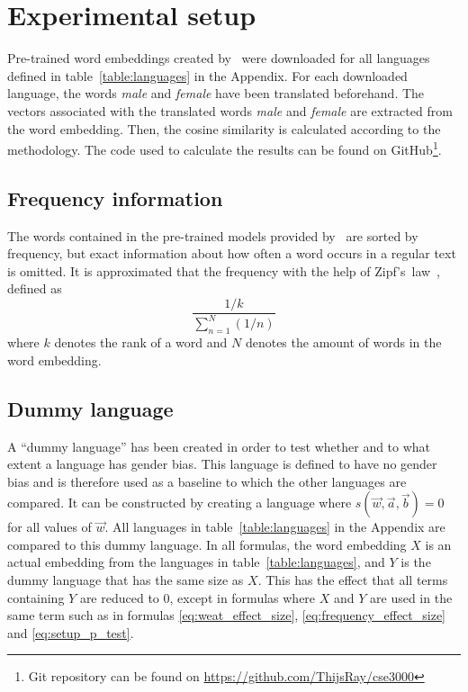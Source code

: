 \section{Experimental setup}
Pre-trained word embeddings created
by~\textcite{grave2018learning} were downloaded for all languages defined in
table~\ref{table:languages} in the Appendix.
For each downloaded language, the words \textit{male} and \textit{female} have been
translated beforehand.
The vectors associated with the translated words \textit{male} and \textit{female} are
extracted from the word embedding. Then, the cosine similarity is calculated
according to the methodology.
The code used to calculate the results can be found on
GitHub\footnote{Git repository can be found on \url{https://github.com/ThijsRay/cse3000}}.

\subsection{Frequency information}
The words contained in the pre-trained models provided by~\textcite{grave2018learning}
are sorted by frequency, but exact information about how often a word occurs in
a regular text is omitted. It is approximated that the frequency with the help of
Zipf's~law~\parencite{Zipf-1935, word_embedding_zipf_context}, defined as 
\begin{equation}
    \frac{1/k}{\displaystyle\sum_{n=1}^{N}(1/n)}
\end{equation}
where $k$ denotes the rank of a word and
$N$ denotes the amount of words in the word embedding.

\subsection{Dummy language} \label{seq:dummy_language}
A ``dummy language'' has been created in order to test whether and to what extent a language has gender bias. This language is defined to have
no gender bias and is therefore used as a baseline to which the other languages
are compared.
It can be constructed by creating a language where $s(\vec{w}, \vec{a}, \vec{b}) = 0$ for all values of $\vec{w}$.
All languages in table~\ref{table:languages} in the Appendix are compared to this
dummy language. In all formulas, the word embedding $X$ is an actual embedding from
the languages in table~\ref{table:languages}, and $Y$ is
the dummy language that has the same size as $X$. This has the effect that all terms
containing $Y$ are
reduced to $0$, except in formulas where $X$ and $Y$ are used in the
same term such as in formulas
\eqref{eq:weat_effect_size}, \eqref{eq:frequency_effect_size} and \eqref{eq:setup_p_test}.

